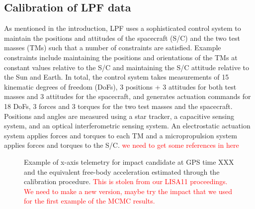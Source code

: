 \documentclass[twocolumn, trackchanges]{aastex61}
\newcommand{\red}[1]{\textcolor{red}{#1}}
\begin{document}
\subsection{Calibration of LPF data}\label{sec:calibration}
As mentioned in the introduction, LPF uses a sophisticated control system to maintain the positions and attitudes of the spacecraft (S/C) and the two test masses (TMs) such that a number of constraints are satisfied.  Example constraints include maintaining the positions and orientations of the TMs at constant values relative to the S/C and maintaining the S/C attitude relative to the Sun and Earth. In total, the control system takes measurements of 15 kinematic degrees of freedom (DoFs), 3 positions + 3 attitudes for both test masses and 3 attitudes for the spacecraft, and generates actuation commands for 18 DoFs, 3 forces and 3 torques for the two test masses and the spacecraft.  Positions and angles are measured using a star tracker, a capacitive sensing system, and an optical interferometric sensing system. An electrostatic actuation system applies forces and torques to each TM and a micropropulsion system applies forces and torques to the S/C. \red{we need to get some references in here}

\begin{figure}
\caption{Example of x-axis telemetry for impact candidate at GPS time XXX and the equivalent free-body acceleration estimated through the calibration procedure.\label{fig:models} \red{This is stolen from our LISA11 proceedings. We need to make a new version, maybe try the impact that we used for the first example of the MCMC results.}}
\end{figure}
\end{document}

